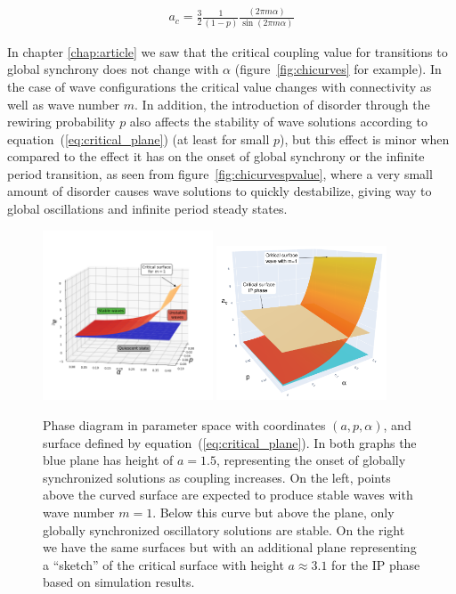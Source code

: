 \begin{align}
	a_c = \frac{3}{2}\frac{1}{(1-p)}\frac{(2\pi m\alpha)}{\sin(2\pi m\alpha)}
	\label{eq:critical_plane}
\end{align}

In chapter \ref{chap:article} we saw that the critical coupling value for transitions to global synchrony does not change with $\alpha$
(figure~\ref{fig:chicurves} for example). In the case of wave configurations the critical value changes with connectivity as well as
wave number $m$. In addition, the introduction of disorder through the rewiring probability $p$ also affects the stability of wave
solutions according to equation~(\ref{eq:critical_plane}) (at least for small $p$), but this effect is minor when compared to the
effect it has on the onset of global synchrony or the infinite period transition, as seen from figure~\ref{fig:chicurvespvalue}, where
a very small amount of disorder causes wave solutions to quickly destabilize, giving way to global oscillations and infinite period
steady states.

\begin{figure}
  \centering
  \includegraphics[width=0.45\textwidth]{fig/chap4/critical_plane.png}
  \includegraphics[width=0.45\textwidth]{fig/chap4/critical_plane_IP.png}
	\caption{
		Phase diagram in parameter space with coordinates $(a,p,\alpha)$, and surface defined by equation~(\ref{eq:critical_plane}). In
		both graphs the blue plane has height of $a=1.5$, representing the onset of globally synchronized solutions as coupling increases.
		On the left, points above the curved surface are expected to produce stable waves with wave number $m=1$. Below this curve but
		above the plane, only globally synchronized oscillatory solutions are stable. On the right we have the same surfaces but with an
		additional plane representing a ``sketch'' of the critical surface with height $a\approx 3.1$ for the IP phase based on simulation
		results.
	}
	\label{fig:critical_plane}
\end{figure}

